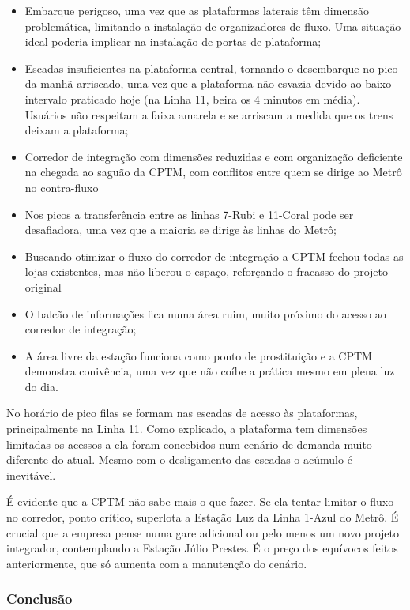 \documentclass[11pt,fleqn]{book} %
\begin{document}
\begin{itemize}
	\item Embarque perigoso, uma vez que as plataformas laterais têm dimensão problemática, limitando a instalação de organizadores de fluxo. Uma situação ideal poderia implicar na instalação de portas de plataforma;
	\item Escadas insuficientes na plataforma central, tornando o desembarque no pico da manhã arriscado, uma vez que a plataforma não esvazia devido ao baixo intervalo praticado hoje (na Linha 11, beira os 4 minutos em média). Usuários não respeitam a faixa amarela e se arriscam a medida que os trens deixam a plataforma;
	\item Corredor de integração com dimensões reduzidas e com organização deficiente na chegada ao saguão da CPTM, com conflitos entre quem se dirige ao Metrô no contra-fluxo
	\item Nos picos a transferência entre as linhas 7-Rubi e 11-Coral pode ser desafiadora, uma vez que a maioria se dirige às linhas do Metrô;
	\item Buscando otimizar o fluxo do corredor de integração a CPTM fechou todas as lojas existentes, mas não liberou o espaço, reforçando o fracasso do projeto original
	\item O balcão de informações fica numa área ruim, muito próximo do acesso ao corredor de integração;
	\item A área livre da estação funciona como ponto de prostituição e a CPTM demonstra conivência, uma vez que não coíbe a prática mesmo em plena luz do dia.
\end{itemize}

No horário de pico filas se formam nas escadas de acesso às plataformas, principalmente na Linha 11. Como explicado, a plataforma tem dimensões limitadas os acessos a ela foram concebidos num cenário de demanda muito diferente do atual. Mesmo com o desligamento das escadas o acúmulo é inevitável.

É evidente que a CPTM não sabe mais o que fazer. Se ela tentar limitar o fluxo no corredor, ponto crítico, superlota a Estação Luz da Linha 1-Azul do Metrô. É crucial que a empresa pense numa gare adicional ou pelo menos um novo projeto integrador, contemplando a Estação Júlio Prestes. É o preço dos equívocos feitos anteriormente, que só aumenta com a manutenção do cenário.

\subsubsection{Conclusão}
\end{document}

